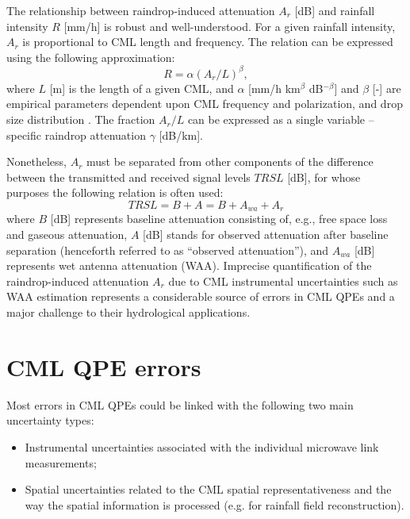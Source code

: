 \documentclass{ctuthesis}\usepackage[]{graphicx}\usepackage[]{color}
\begin{document}
The relationship between raindrop-induced attenuation $A_r$ [dB] and rainfall intensity $R$ [mm/h] is robust and well-understood. For a given rainfall intensity, $A_r$ is proportional to CML length and frequency. The relation can be expressed using the following approximation:
        \begin{equation} \label{eq:2eq1}
        R = \alpha (A_r / L)^\beta,
        \end{equation}
where $L$ [m] is the length of a given CML, and $\alpha$ [mm/h km$^\beta$ dB$^{-\beta}$] and $\beta$ [-] are empirical parameters dependent upon CML frequency and polarization, and drop size distribution \citep{olsenARbRelationCalculation1978}. The fraction $A_r / L$ can be expressed as a single variable -- specific raindrop attenuation $\gamma$ [dB/km].

Nonetheless, $A_r$ must be separated from other components of the difference between the transmitted and received signal levels $T\!R\!S\!L$ [dB], for whose purposes the following relation is often used: 
        \begin{equation} \label{eq:2eq2}
        T\!R\!S\!L = B + A = B + A_{wa} + A_r
        \end{equation}
where $B$ [dB] represents baseline attenuation consisting of, e.g., free space loss and gaseous attenuation, $A$ [dB] stands for observed attenuation after baseline separation (henceforth referred to as “observed attenuation”), and $A_{wa}$ [dB] represents wet antenna attenuation (WAA). Imprecise quantification of the raindrop-induced attenuation $A_r$ due to CML instrumental uncertainties such as WAA estimation represents a considerable source of errors in CML QPEs  \citep{chwalaCommercialMicrowaveLink2019} and a major challenge to their hydrological applications.


\section{CML QPE errors}

Most errors in CML QPEs could be linked with the following two main uncertainty types: 
\begin{itemize}
        \item Instrumental uncertainties associated with the individual microwave link measurements; 
        \item Spatial uncertainties related to the CML spatial representativeness and the way the spatial information is processed (e.g. for rainfall field reconstruction).
\end{itemize}
\end{document}

